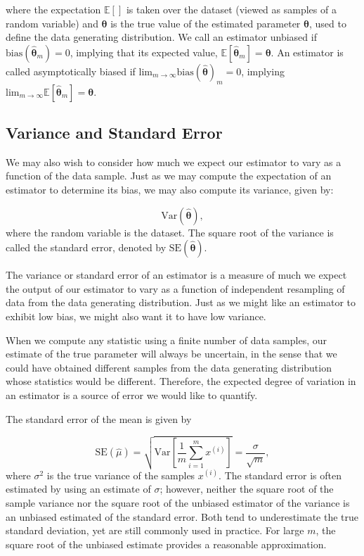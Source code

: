where the expectation $\mathbb{E}[]$ is taken over the dataset (viewed as samples of a random variable) and $\boldsymbol{\theta}$ is the true value of the estimated parameter $\boldsymbol{\theta}$, used to define the data generating distribution. We call an estimator unbiased if $\text{bias}(\boldsymbol{\hat\theta}_m) = 0$, implying that its expected value, $\mathbb{E}[\boldsymbol{\hat\theta}_m] = \boldsymbol{\theta}$. An estimator is called asymptotically biased if $\text{lim}_{m \rightarrow \infty} \text{bias}(\boldsymbol{\hat\theta})_m = 0$, implying $\text{lim}_{m \rightarrow \infty} \mathbb{E}[\boldsymbol{\hat\theta}_m] = \boldsymbol{\theta}$.




\subsection{Variance and Standard Error}

We may also wish to consider how much we expect our estimator to vary as a function of the data sample. Just as we may compute the expectation of an estimator to determine its bias, we may also compute its variance, given by:

\begin{equation}
\text{Var}(\boldsymbol{\hat\theta}),
\end{equation}
where the random variable is the dataset. The square root of the variance is called the standard error, denoted by $\text{SE}(\boldsymbol{\hat\theta})$.

The variance or standard error of an estimator is a measure of much we expect the output of our estimator to vary as a function of independent resampling of data from the data generating distribution. Just as we might like an estimator to exhibit low bias, we might also want it to have low variance.

When we compute any statistic using a finite number of data samples, our estimate of the true parameter will always be uncertain, in the sense that we could have obtained different samples from the data generating distribution whose statistics would be different. Therefore, the expected degree of variation in an estimator is a source of error we would like to quantify.

The standard error of the mean is given by

\begin{equation}
\text{SE}(\hat\mu) = \sqrt{\text{Var}\left[\frac{1}{m}\sum_{i=1}^{m} x^{(i)}\right]} = \frac{\sigma}{\sqrt{m}},
\end{equation}
where $\sigma^2$ is the true variance of the samples $x^{(i)}$. The standard error is often estimated by using an estimate of $\sigma$; however, neither the square root of the sample variance nor the square root of the unbiased estimator of the variance is an unbiased estimated of the standard error. Both tend to underestimate the true standard deviation, yet are still commonly used in practice. For large $m$, the square root of the unbiased estimate provides a reasonable approximation.

